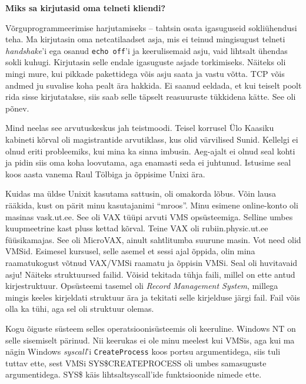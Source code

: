 \textbf{Miks sa kirjutasid oma telneti kliendi?}

Võrguprogrammeerimise harjutamiseks -- tahtsin osata igasuguseid sokliühendusi
teha. Ma kirjutasin oma netcatilaadset asja, mis ei teinud mingisugust telneti
\emph{handshake}'i ega osanud \verb|echo off|'i ja keerulisemaid
asju, vaid lihtsalt ühendas sokli kuhugi. Kirjutasin selle endale
igasuguste asjade torkimiseks. Näiteks oli mingi mure, kui pikkade
pakettidega võis asju saata ja vastu võtta. TCP võis andmed ju suvalise koha
pealt ära hakkida. Ei saanud eeldada, et kui teiselt poolt rida sisse
kirjutatakse, siis saab selle täpselt reasuuruste tükkidena kätte. See oli
põnev.

Mind neelas see arvutuskeskus jah teistmoodi. Teisel korrusel Ülo
Kaasiku kabineti kõrval oli magistrantide arvutiklass,
kus olid värvilised Sunid. Kellelgi
ei olnud eriti probleemiks, kui mina ka sinna imbusin. Aeg-ajalt ei olnud seal
kohti ja pidin siis oma koha loovutama, aga enamasti seda ei
juhtunud. Istusime seal koos aasta vanema Raul Tölbiga ja
õppisime Unixi ära.

Kuidas ma üldse Unixit kasutama sattusin, oli omakorda lõbus. 
Võin lausa rääkida, kust on pärit minu kasutajanimi \enquote{mroos}. Minu
esimene online-konto oli masinas vask.ut.ee. See oli
VAX tüüpi arvuti
VMS opsüsteemiga.
Selline umbes kuupmeetrine kast pluss kettad kõrval. Teine VAX oli
rubiin.physic.ut.ee füüsikamajas. See oli
MicroVAX, ainult sahtlitumba suurune masin. Vot need olid VMSid. Esimesel
kursusel, selle asemel et sessi ajal õppida, olin mina raamatukogust võtnud
VAX/VMSi raamatu ja õppisin VMSi. Seal oli huvitavaid asju! Näiteks 
struktuursed failid. Võisid tekitada tühja faili, millel on ette antud
kirjestruktuur. Opsüsteemi tasemel oli \emph{Record Management System}, millega
mingis keeles kirjeldati struktuur ära ja tekitati selle kirjelduse järgi fail.
Fail võis olla ka tühi, aga sel oli struktuur olemas.

Kogu õiguste süsteem selles operatsioonisüsteemis oli keeruline. Windows
NT on selle sisemiselt pärinud. Nii
keerukas ei ole minu meelest kui VMSis, aga kui ma nägin Windows \emph{syscall}'i
\verb|CreateProcess| koos portsu argumentidega, siis tuli tuttav ette, sest
VMSi SYS\$CREATEPROCESS oli umbes samasuguste argumentidega. SYS\$ käis lihtsaltsyscall'ide funktsioonide nimede ette.


